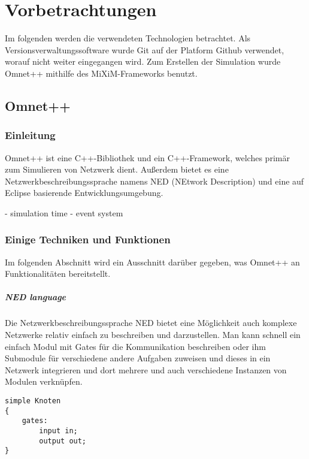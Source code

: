 \chapter{Vorbetrachtungen}

Im folgenden werden die verwendeten Technologien betrachtet. Als Versionsverwaltungssoftware wurde Git\cite{git} auf der Platform Github\cite{github} verwendet, worauf nicht weiter eingegangen wird. Zum Erstellen der Simulation wurde Omnet++\cite{omnet} mithilfe des MiXiM-Frameworks\cite{mixim} benutzt.

\section{Omnet++}

\subsection{Einleitung}

Omnet++\cite{omnet} ist eine C++-Bibliothek und ein C++-Framework, welches primär zum Simulieren von Netzwerk dient. Außerdem bietet es eine Netzwerkbeschreibungssprache namens NED (NEtwork Description) und eine auf Eclipse\cite{eclipse} basierende Entwicklungsumgebung.

- simulation time
- event system

\subsection{Einige Techniken und Funktionen}

Im folgenden Abschnitt wird ein Ausschnitt darüber gegeben, was Omnet++ an Funktionalitäten bereitstellt.

\paragraph{NED language\cite{ned}}

Die Netzwerkbeschreibungssprache NED bietet eine Möglichkeit auch komplexe Netzwerke relativ einfach zu beschreiben und darzustellen. Man kann schnell ein einfach Modul mit Gates für die Kommunikation beschreiben oder ihm Submodule für verschiedene andere Aufgaben zuweisen und dieses in ein Netzwerk integrieren und dort mehrere und auch verschiedene Instanzen von Modulen verknüpfen.

\begin{minipage}{\textwidth}
\begin{lstlisting}[language=ned]
simple Knoten
{
	gates:
		input in;
		output out;
}
\end{lstlisting}
\end{minipage}

